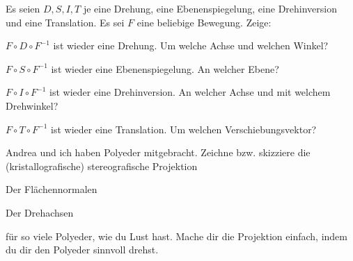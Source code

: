 \begin{sheet}
\begin{problem}[title={Konjugation geometrisch}, difficulty={mittel}]
Es seien $D,S,I,T$ je eine Drehung, eine Ebenenspiegelung, eine Drehinversion und eine Translation. Es sei $F$ eine beliebige Bewegung. Zeige:
\begin{subproblem}
$F\circ D\circ F^{-1}$ ist wieder eine Drehung. Um welche Achse und welchen Winkel?
\end{subproblem}
\begin{subproblem}
$F\circ S\circ F^{-1}$ ist wieder eine Ebenenspiegelung. An welcher Ebene?
\end{subproblem}
\begin{subproblem}
$F\circ I\circ F^{-1}$ ist wieder eine Drehinversion. An welcher Achse und mit welchem Drehwinkel?
\end{subproblem}
\begin{subproblem}
$F\circ T\circ F^{-1}$ ist wieder eine Translation. Um welchen Verschiebungsvektor?
\end{subproblem}
\end{problem}

\begin{problem}
	Andrea und ich haben Polyeder mitgebracht. Zeichne bzw. skizziere die (kristallografische) stereografische Projektion
	\begin{subproblem}
		Der Flächennormalen
	\end{subproblem}
	\begin{subproblem}
		Der Drehachsen
	\end{subproblem}
	für so viele Polyeder, wie du Lust hast. Mache dir die Projektion einfach, indem du dir den Polyeder sinnvoll drehst. 
\end{problem}

\end{sheet}